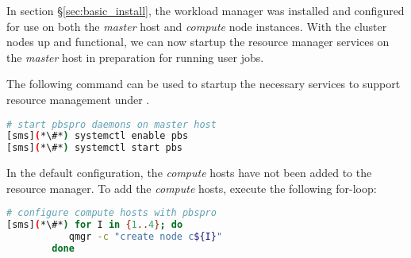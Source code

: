 In section \S\ref{sec:basic_install}, the \rms{} workload manager was installed
and configured for use on both the {\em master} host and {\em compute} node
instances. With the cluster nodes up and functional, we can now startup the
resource manager services on the {\em master} host in preparation for running 
user jobs.

The following command can be used to startup the necessary services to support
resource management under \rms{}.

\begin{lstlisting}[language=bash,keywords={}]
# start pbspro daemons on master host
[sms](*\#*) systemctl enable pbs
[sms](*\#*) systemctl start pbs
\end{lstlisting}

In the default configuration, the {\em compute} hosts have not been added to 
the \rms{} resource manager. To add the {\em compute} hosts, execute 
the following for-loop:

\begin{lstlisting}[language=bash,keywords={}]
# configure compute hosts with pbspro
[sms](*\#*) for I in {1..4}; do
           qmgr -c "create node c${I}"
        done

\end{lstlisting}
